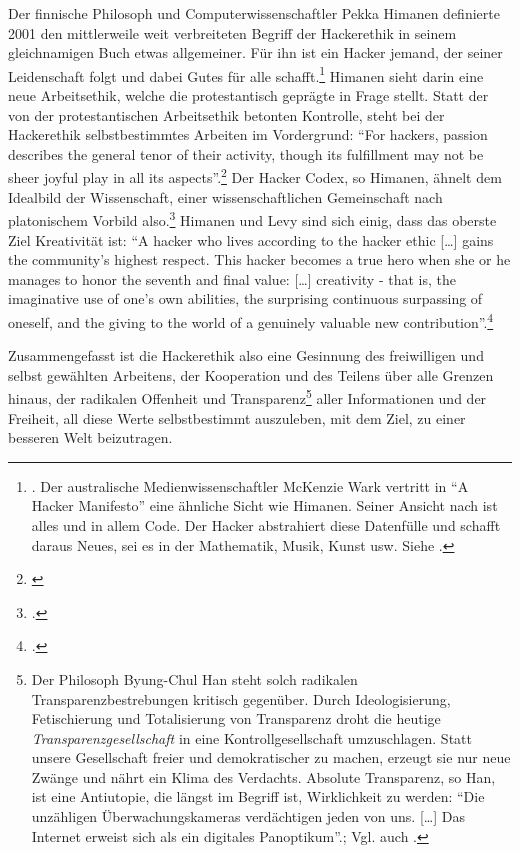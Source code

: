\documentclass[
paper=164mm:234mm, %
pagesize, %
DIV=calc, %
10pt, %
BCOR=0mm, %
parskip=half- %
]{scrbook}
\begin{document}
Der finnische Philosoph und Computerwissenschaftler Pekka Himanen definierte 2001 den mittlerweile weit verbreiteten Begriff der Hackerethik in seinem gleichnamigen Buch etwas allgemeiner. Für ihn ist ein Hacker jemand, der seiner Leidenschaft folgt und dabei Gutes für alle schafft.\footnote{\cite[3-6]{Himanen:2001}. Der australische Medienwissenschaftler McKenzie Wark vertritt in \enquote{A Hacker Manifesto} eine ähnliche Sicht wie Himanen. Seiner Ansicht nach ist alles und in allem Code. Der Hacker abstrahiert diese Datenfülle und schafft daraus Neues, sei es in der Mathematik, Musik, Kunst usw. Siehe \cite[13]{McKenzie:2006}.} Himanen sieht darin eine neue Arbeitsethik, welche die protestantisch geprägte in Frage stellt. Statt der von der protestantischen Arbeitsethik betonten Kontrolle, steht bei der Hackerethik selbstbestimmtes Arbeiten im Vordergrund: \enquote{For hackers, passion describes the general tenor of their activity, though its fulfillment may not be sheer joyful play in all its aspects}.\footnote{\cite[18]{Himanen:2001}} Der Hacker Codex, so Himanen, ähnelt dem Idealbild der Wissenschaft, einer wissenschaftlichen Gemeinschaft nach platonischem Vorbild also.\footnote{\cite[7-19]{Himanen:2001}.} Himanen und Levy sind sich einig, dass das oberste Ziel Kreativität ist: \enquote{A hacker who lives according to the hacker ethic [\dots] gains the community's highest respect. This hacker becomes a true hero when she or he manages to honor the seventh and final value: [\dots] creativity - that is, the imaginative use of one's own abilities, the surprising continuous surpassing of oneself, and the giving to the world of a genuinely valuable new contribution}.\footnote{\cite[141]{Himanen:2001}.}

Zusammengefasst ist die Hackerethik also eine Gesinnung des freiwilligen und selbst gewählten Arbeitens, der Kooperation und des Teilens über alle Grenzen hinaus, der radikalen Offenheit und Transparenz\footnote{Der Philosoph Byung-Chul Han steht solch radikalen Transparenzbestrebungen kritisch gegenüber. Durch Ideologisierung, Fetischierung und Totalisierung von Transparenz droht die heutige \emph{Transparenzgesellschaft} in eine Kontrollgesellschaft umzuschlagen. Statt unsere Gesellschaft freier und demokratischer zu machen, erzeugt sie nur neue Zwänge und nährt ein Klima des Verdachts. Absolute Transparenz, so Han, ist eine Antiutopie, die längst im Begriff ist, Wirklichkeit zu werden: \enquote{Die unzähligen Überwachungskameras verdächtigen jeden von uns. [\dots] Das Internet erweist sich als ein digitales Panoptikum}.\cite{Han:2012}; Vgl. auch \cite{Han:2013}.} aller Informationen und der Freiheit, all diese Werte selbstbestimmt auszuleben, mit dem Ziel, zu einer besseren Welt beizutragen.
\end{document}
